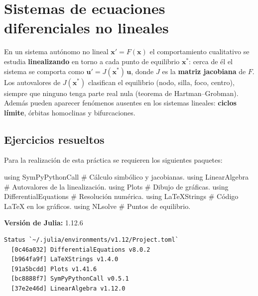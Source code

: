 \documentclass[
  spanish,
  a4paper,
]{scrreport}
\newenvironment{Shaded}{\begin{snugshade}}{\end{snugshade}}
\newcommand{\BuiltInTok}[1]{\textcolor[rgb]{0.00,0.23,0.31}{#1}}
\newcommand{\CommentTok}[1]{\textcolor[rgb]{0.37,0.37,0.37}{#1}}
\newcommand{\ImportTok}[1]{\textcolor[rgb]{0.00,0.46,0.62}{#1}}
\theoremstyle{definition}
\theoremstyle{remark}
\begin{document}

\chapter{Sistemas de ecuaciones diferenciales no
lineales}\label{sistemas-de-ecuaciones-diferenciales-no-lineales}

En un sistema autónomo no lineal \(\mathbf{x}' = F(\mathbf{x})\) el
comportamiento cualitativo se estudia \textbf{linealizando} en torno a
cada punto de equilibrio \(\mathbf{x}^*\): cerca de él el sistema se
comporta como \(\mathbf{u}' = J(\mathbf{x}^*)\,\mathbf{u}\), donde \(J\)
es la \textbf{matriz jacobiana} de \(F\). Los autovalores de
\(J(\mathbf{x}^*)\) clasifican el equilibrio (nodo, silla, foco,
centro), siempre que ninguno tenga parte real nula (teorema de
Hartman--Grobman). Además pueden aparecer fenómenos ausentes en los
sistemas lineales: \textbf{ciclos límite}, órbitas homoclinas y
bifurcaciones.

\section{Ejercicios resueltos}\label{ejercicios-resueltos-4}

Para la realización de esta práctica se requieren los siguientes
paquetes:

\begin{Shaded}
\begin{Highlighting}[]
\ImportTok{using} \BuiltInTok{SymPyPythonCall}        \CommentTok{\# Cálculo simbólico y jacobianas.}
\ImportTok{using} \BuiltInTok{LinearAlgebra}          \CommentTok{\# Autovalores de la linealización.}
\ImportTok{using} \BuiltInTok{Plots}                  \CommentTok{\# Dibujo de gráficas.}
\ImportTok{using} \BuiltInTok{DifferentialEquations}  \CommentTok{\# Resolución numérica.}
\ImportTok{using} \BuiltInTok{LaTeXStrings}           \CommentTok{\# Código LaTeX en los gráficos.}
\ImportTok{using} \BuiltInTok{NLsolve}                \CommentTok{\# Puntos de equilibrio.}
\end{Highlighting}
\end{Shaded}

\begin{tcolorbox}[enhanced jigsaw, arc=.35mm, bottomrule=.15mm, bottomtitle=1mm, breakable, colback=white, colbacktitle=quarto-callout-note-color!10!white, colframe=quarto-callout-note-color-frame, coltitle=black, left=2mm, leftrule=.75mm, opacityback=0, opacitybacktitle=0.6, rightrule=.15mm, title=\textcolor{quarto-callout-note-color}{\faInfo}\hspace{0.5em}{Versiones de Julia y de los paquetes utilizados}, titlerule=0mm, toprule=.15mm, toptitle=1mm]

\textbf{Versión de Julia:} 1.12.6

\begin{verbatim}
Status `~/.julia/environments/v1.12/Project.toml`
  [0c46a032] DifferentialEquations v8.0.2
  [b964fa9f] LaTeXStrings v1.4.0
  [91a5bcdd] Plots v1.41.6
  [bc8888f7] SymPyPythonCall v0.5.1
  [37e2e46d] LinearAlgebra v1.12.0
\end{verbatim}

\end{tcolorbox}
\end{document}
